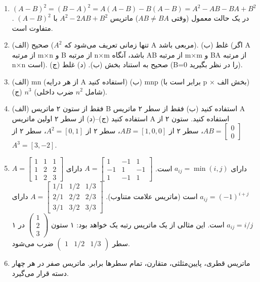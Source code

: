 \documentclass[12pt,a4paper]{article}
\begin{document}
{\begin{enumerate}
			\item $(A-B)^2 = (B-A)^2 = A(A-B)-B(A-B) = A^2-AB-BA+B^2$. در یک حالت معمول (وقتی $AB \neq BA$) ماتریس $A^2-2AB+B^2$ با $(A-B)^2$ متفاوت است.
			
			\item (الف) صحیح ($A^2$ تنها زمانی تعریف می‌شود که A مربعی باشد).
			(ب) غلط (اگر A از مرتبه m×n و B از مرتبه n×m باشد، آنگاه AB از مرتبه m×m و BA از مرتبه n×n است).
			(ج) صحیح به استناد بخش (ب).
			(د) غلط (B=0 را در نظر بگیرید).
			
			\item (الف) mn (از هر درایه A استفاده کنید) (ب) mnp (برابر است با p × بخش الف) (ج) $n^3$ (شامل $n^2$ ضرب داخلی).
			
			\item (الف) فقط از ستون ۲ ماتریس B استفاده کنید (ب) فقط از سطر ۲ ماتریس A استفاده کنید (ج)–(د) از سطر ۲ اولین ماتریس A استفاده کنید.
			ستون ۲ از $AB = \begin{bmatrix} 0 \\ 0 \end{bmatrix}$، سطر ۲ از $AB = [1, 0, 0]$، سطر ۲ از $A^2 = [0, 1]$، سطر ۲ از $A^3 = [3, -2]$.
			
			\item $A = \begin{bmatrix} 1 & 1 & 1 \\ 1 & 2 & 2 \\ 1 & 2 & 3 \end{bmatrix}$ دارای $a_{ij} = \min(i,j)$ است. $A = \begin{bmatrix} 1 & -1 & 1 \\ -1 & 1 & -1 \\ 1 & -1 & 1 \end{bmatrix}$ دارای $a_{ij} = (-1)^{i+j}$ است (ماتریس علامت متناوب). $A = \begin{bmatrix} 1/1 & 1/2 & 1/3 \\ 2/1 & 2/2 & 2/3 \\ 3/1 & 3/2 & 3/3 \end{bmatrix}$ دارای $a_{ij} = i/j$ است. این مثالی از یک ماتریس رتبه یک خواهد بود: ۱ ستون $\begin{pmatrix} 1 \\ 2 \\ 3 \end{pmatrix}$ در ۱ سطر $\begin{pmatrix} 1 & 1/2 & 1/3 \end{pmatrix}$ ضرب می‌شود.
			
			\item ماتریس قطری، پایین‌مثلثی، متقارن، تمام سطرها برابر. ماتریس صفر در هر چهار دسته قرار می‌گیرد.
			

\end{enumerate}}
\end{document}
